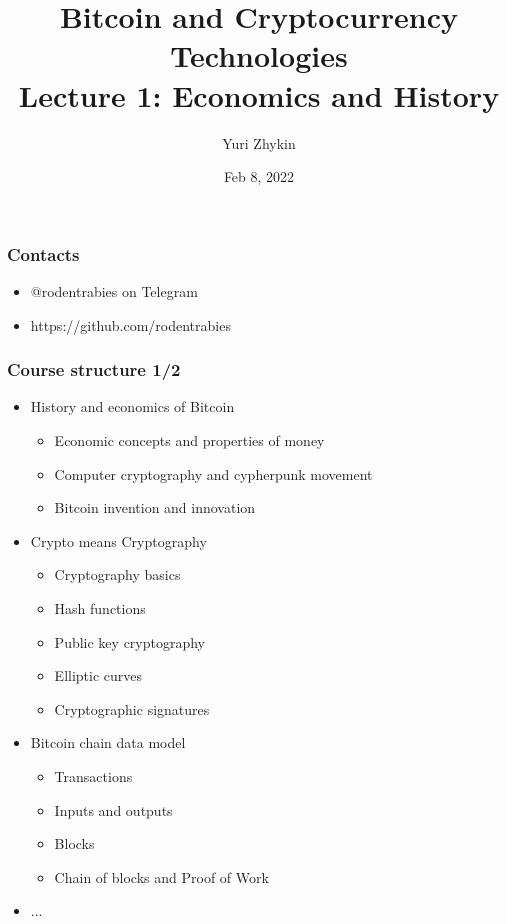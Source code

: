 \documentclass{beamer}
\title{
  Bitcoin and Cryptocurrency Technologies \\
  Lecture 1: Economics and History
}
\author{Yuri Zhykin}
\date{Feb 8, 2022}
\begin{document}
\frame{\titlepage}

\begin{frame}
  \frametitle{Contacts}
  \begin{itemize}
  \item @rodentrabies on Telegram
  \item https://github.com/rodentrabies
  \end{itemize}
\end{frame}

\begin{frame}
  \frametitle{Course structure 1/2}
  \begin{itemize}
  \item History and economics of Bitcoin
    \begin{itemize}
    \item Economic concepts and properties of money
    \item Computer cryptography and cypherpunk movement
    \item Bitcoin invention and innovation
    \end{itemize}
  \item Crypto means Cryptography
    \begin{itemize}
    \item Cryptography basics
    \item Hash functions
    \item Public key cryptography
    \item Elliptic curves
    \item Cryptographic signatures
    \end{itemize}
  \item Bitcoin chain data model
    \begin{itemize}
    \item Transactions
    \item Inputs and outputs
    \item Blocks
    \item Chain of blocks and Proof of Work
    \end{itemize}
  \item[] ...
  \end{itemize}
\end{frame}
\end{document}
